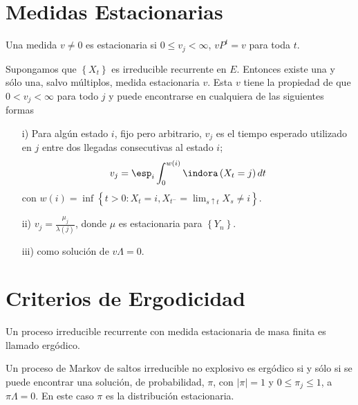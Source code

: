 \section{Medidas Estacionarias}
%


\begin{Def}
Una medida $v\neq0$ es estacionaria si $0\leq v_{j}<\infty$, $vP^{t}=v$ para toda $t$.
\end{Def}

\begin{Teo}\label{Teo.4.2}
Supongamos que $\left\{X_{t}\right\}$ es irreducible recurrente en $E$. Entonces existe una y s\'olo una, salvo m\'ultiplos, medida estacionaria $v$. Esta $v$ tiene la propiedad de que $0<v_{j}<\infty$ para todo $j$ y puede encontrarse en cualquiera de las siguientes formas

\begin{itemize}
\item[i)] Para alg\'un estado $i$, fijo pero arbitrario, $v_{j}$ es el tiempo esperado utilizado en $j$ entre dos llegadas consecutivas al estado $i$;
\begin{equation}\label{Eq.4.2}
v_{j}=\esp_{i}\int_{0}^{w\left(i\right)}\indora\left(X_{t}=j\right)dt
\end{equation}
con $w\left(i\right)=\inf\left\{t>0:X_{t}=i,X_{t^{-}}=\lim_{s\uparrow t}X_{s}\neq i\right\}$. 
\item[ii)]
$v_{j}=\frac{\mu_{j}}{\lambda\left(j\right)}$, donde $\mu$ es estacionaria para $\left\{Y_{n}\right\}$. 
\item[iii)] como soluci\'on de $v\Lambda=0$.
\end{itemize}
\end{Teo}


\section{Criterios de Ergodicidad}
%

\begin{Def}
Un proceso irreducible recurrente con medida estacionaria de masa finita es llamado erg\'odico.
\end{Def}

\begin{Teo}\label{Teo.4.3}
Un proceso de Markov de saltos irreducible no explosivo es erg\'odico si y s\'olo si se puede encontrar una soluci\'on, de probabilidad, $\pi$, con $|\pi|=1$ y $0\leq\pi_{j}\leq1$, a $\pi\Lambda=0$. En este caso $\pi$ es la distribuci\'on estacionaria.
\end{Teo}

